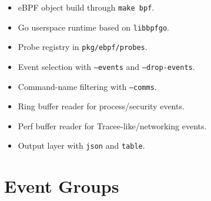 \documentclass[11pt,a4paper]{article}
\begin{document}
\begin{itemize}
  \item eBPF object build through \texttt{make bpf}.
  \item Go userspace runtime based on \texttt{libbpfgo}.
  \item Probe registry in \texttt{pkg/ebpf/probes}.
  \item Event selection with \texttt{--events} and \texttt{--drop-events}.
  \item Command-name filtering with \texttt{--comms}.
  \item Ring buffer reader for process/security events.
  \item Perf buffer reader for Tracee-like/networking events.
  \item Output layer with \texttt{json} and \texttt{table}.
\end{itemize}

\section{Event Groups}
\end{document}
